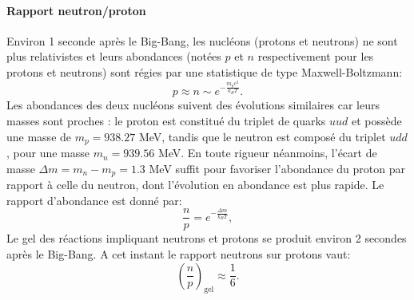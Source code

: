 \paragraph{Rapport neutron/proton}
 Environ 1 seconde après le Big-Bang, les nucléons (protons et neutrons) ne sont plus relativistes et leurs abondances (notées $p$ et $n$ respectivement pour les protons et neutrons) sont régies par une statistique de type Maxwell-Boltzmann:
\begin{equation}
p\approx n \sim e^{-\frac{m_p c^2}{k_B T}}.
\end{equation}
Les abondances des deux nucléons suivent des évolutions similaires car leurs masses sont proches : le proton est constitué du triplet de quarks $uud$  et possède une masse de $m_p=938.27$ MeV, tandis que le neutron est composé du triplet $udd$, pour une masse $m_n=939.56$ MeV. En toute rigueur néanmoins, l'écart de masse $\Delta m=m_n-m_p=1.3$ MeV suffit pour favoriser l'abondance du proton par rapport à celle du neutron, dont l'évolution en abondance est plus rapide. Le rapport d'abondance est donné par:
\begin{equation}
\frac{n}{p}=e^{-\frac{\Delta m}{k_B T}},
\end{equation}
Le gel des réactions impliquant neutrons et protons se produit environ 2 secondes après le Big-Bang. A cet instant le rapport neutrons sur protons vaut:
\begin{equation}
\left(\frac{n}{p}\right)_\mathrm{gel}\approx\frac{1}{6}.
\end{equation}


